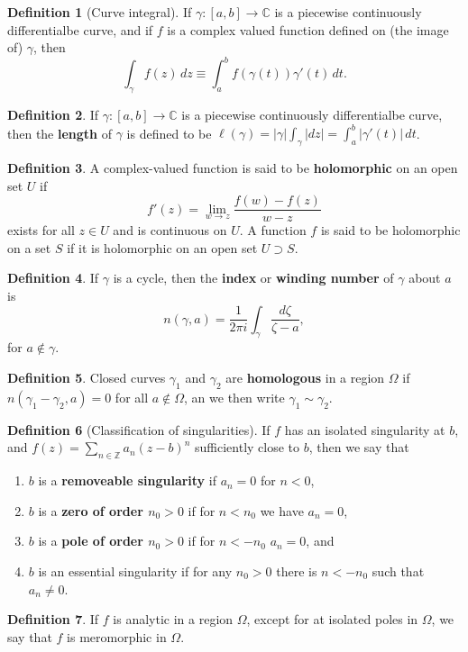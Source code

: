 \documentclass[12pt]{article}
\theoremstyle{definition}
\newtheorem{definition}{Definition}
\newcommand{\Z}{\mathbb{Z}}
\newcommand{\C}{\mathbb{C}}    %
\begin{document}
\begin{definition}[Curve integral]
    If $\gamma:[a,b]\to\C$ is a piecewise continuously differentialbe curve, and if $f$ is a complex valued function defined on (the image of) $\gamma$, then
    \begin{equation}
        \int_{\gamma}f(z)\,dz\equiv\int_{a}^bf(\gamma(t))\gamma'(t)\,dt.
    \end{equation}
\end{definition}
\begin{definition}
    If $\gamma:[a,b]\to\C$ is a piecewise continuously differentialbe curve, then the \textbf{length} of $\gamma$ is defined to be $\ell(\gamma)=|\gamma|\int_\gamma |dz|=\int_a^b|\gamma'(t)|\,dt$.
\end{definition}

\begin{definition}
    A complex-valued function is said to be \textbf{holomorphic} on an open set $U$ if
    \begin{equation*}
        f'(z)=\lim_{w\to z} \frac{f(w)-f(z)}{w-z}
    \end{equation*}
    exists for all $z\in U$ and is continuous on $U$. A function $f$ is said to be holomorphic on a set $S$ if it is holomorphic on an open set $U\supset S$.
\end{definition}
\begin{definition}
    If $\gamma$ is a cycle, then the \textbf{index} or \textbf{winding number} of $\gamma$ about $a$ is 
    \begin{equation*}
        n(\gamma,a)=\frac{1}{2\pi i}\int_\gamma \frac{d\zeta}{\zeta-a},
    \end{equation*}
    for $a\notin\gamma$.
\end{definition}
\begin{definition}
    Closed curves $\gamma_1$ and $\gamma_2$ are \textbf{homologous} in a region $\Omega$ if $n(\gamma_1-\gamma_2,a)=0$ for all $a\notin \Omega$, an we then write $\gamma_1\sim \gamma_2$.
\end{definition}
\begin{definition}[Classification of singularities]
    If $f$ has an isolated singularity at $b$, and $f(z)=\sum_{n\in\Z} a_n(z-b)^n$ sufficiently close to $b$, then we say that
    \begin{enumerate}[label=(\alph*)]
        \item $b$ is a \textbf{removeable singularity} if $a_n=0$ for $n<0$,
        \item $b$ is a \textbf{zero of order $n_0>0$} if for $n<n_0$ we have $a_n=0$,
        \item $b$ is a \textbf{pole of order $n_0>0$} if for $n<-n_0$ $a_n=0$, and
        \item $b$ is an essential singularity if for any $n_0>0$ there is $n<-n_0$ such that $a_n\neq 0$.  
    \end{enumerate}
\end{definition}
\begin{definition}
    If $f$ is analytic in a region $\Omega$, except for at isolated poles in $\Omega$, we say that $f$ is meromorphic in $\Omega$.
\end{definition}
\end{document}
